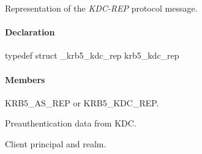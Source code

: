 \documentclass[letterpaper,10pt,english]{sphinxmanual}
\begin{document}
\begin{fulllineitems}
\label{appdev/refs/types/krb5_kdc_rep:krb5_kdc_rep}
\end{fulllineitems}


Representation of the \emph{KDC-REP} protocol message.


\paragraph{Declaration}
\label{appdev/refs/types/krb5_kdc_rep:declaration}
typedef struct \_krb5\_kdc\_rep  krb5\_kdc\_rep


\paragraph{Members}
\label{appdev/refs/types/krb5_kdc_rep:members}

\begin{fulllineitems}
\label{appdev/refs/types/krb5_kdc_rep:krb5_kdc_rep.magic}
\end{fulllineitems}


\begin{fulllineitems}
\label{appdev/refs/types/krb5_kdc_rep:krb5_kdc_rep.msg_type}
KRB5\_AS\_REP or KRB5\_KDC\_REP.

\end{fulllineitems}


\begin{fulllineitems}
\label{appdev/refs/types/krb5_kdc_rep:krb5_kdc_rep.padata}
Preauthentication data from KDC.

\end{fulllineitems}


\begin{fulllineitems}
\label{appdev/refs/types/krb5_kdc_rep:krb5_kdc_rep.client}
Client principal and realm.

\end{fulllineitems}
\end{document}
